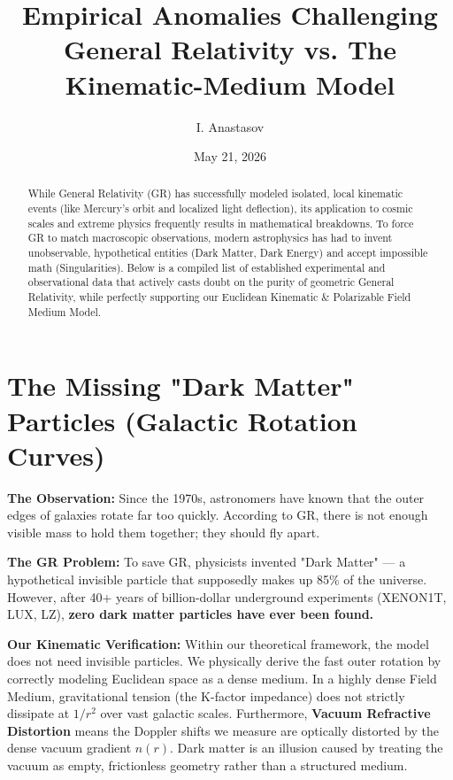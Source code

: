 \documentclass[reprint,amsmath,amssymb,aps,prd,twocolumn]{revtex4-2}
\begin{document}
\title{Empirical Anomalies Challenging General Relativity vs. The Kinematic-Medium Model}
\author{I. Anastasov \texorpdfstring{\href{https://github.com/rt20bg/Anastasov_Theory}{\faGithub}}{}}
\date{May 21, 2026}

\begin{abstract}
While General Relativity (GR) has successfully modeled isolated, local kinematic events (like Mercury's orbit and localized light deflection), its application to cosmic scales and extreme physics frequently results in mathematical breakdowns. To force GR to match macroscopic observations, modern astrophysics has had to invent unobservable, hypothetical entities (Dark Matter, Dark Energy) and accept impossible math (Singularities). Below is a compiled list of established experimental and observational data that actively casts doubt on the purity of geometric General Relativity, while perfectly supporting our Euclidean Kinematic \& Polarizable Field Medium Model.

\end{abstract}

\maketitle

\section{The Missing "Dark Matter" Particles (Galactic Rotation Curves)}
\textbf{The Observation:} Since the 1970s, astronomers have known that the outer edges of galaxies rotate far too quickly. According to GR, there is not enough visible mass to hold them together; they should fly apart.

\textbf{The GR Problem:} To save GR, physicists invented "Dark Matter" — a hypothetical invisible particle that supposedly makes up 85\% of the universe. However, after 40+ years of billion-dollar underground experiments (XENON1T, LUX, LZ), \textbf{zero dark matter particles have ever been found.}

\textbf{Our Kinematic Verification:} Within our theoretical framework, the model does not need invisible particles. We physically derive the fast outer rotation by correctly modeling Euclidean space as a dense medium. In a highly dense Field Medium, gravitational tension (the K-factor impedance) does not strictly dissipate at $1/r^2$ over vast galactic scales. Furthermore, \textbf{Vacuum Refractive Distortion} means the Doppler shifts we measure are optically distorted by the dense vacuum gradient $n(r)$. Dark matter is an illusion caused by treating the vacuum as empty, frictionless geometry rather than a structured medium.
\end{document}
